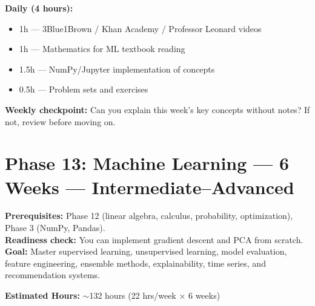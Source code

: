 \documentclass[11pt, a4paper, oneside]{report}
\begin{document}
\begin{practicebox}
\textbf{Daily (4 hours):}
\begin{itemize}[leftmargin=*]
\item 1h --- 3Blue1Brown / Khan Academy / Professor Leonard videos
\item 1h --- Mathematics for ML textbook reading
\item 1.5h --- NumPy/Jupyter implementation of concepts
\item 0.5h --- Problem sets and exercises
\end{itemize}


\textbf{Weekly checkpoint:} Can you explain this week's key concepts without notes? If not, review before moving on.
\end{practicebox}

\clearpage
\section[Phase 13: Machine Learning]{Phase 13: Machine Learning --- 6 Weeks --- Intermediate--Advanced}

\begin{prereqbox}
\textbf{Prerequisites:} Phase 12 (linear algebra, calculus, probability, optimization), Phase 3 (NumPy, Pandas).\\
\textbf{Readiness check:} You can implement gradient descent and PCA from scratch.\\
\textbf{Goal:} Master supervised learning, unsupervised learning, model evaluation, feature engineering, ensemble methods, explainability, time series, and recommendation systems.


\textbf{Estimated Hours:} $\sim$132 hours (22 hrs/week $\times$ 6 weeks)
\end{prereqbox}
\end{document}
